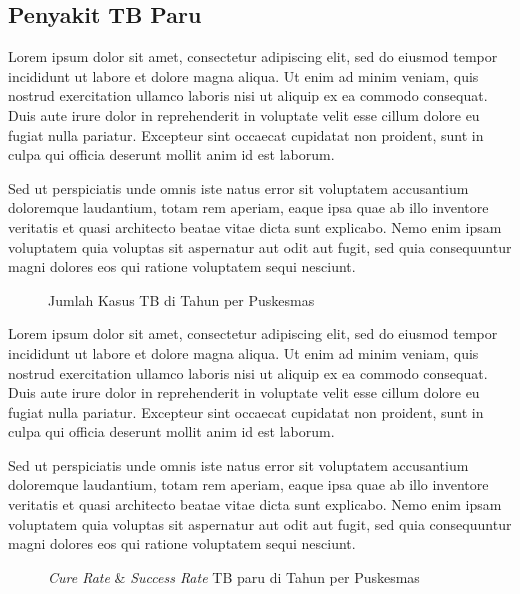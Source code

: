 \subsection{Penyakit TB Paru}

Lorem ipsum dolor sit amet, consectetur adipiscing elit, sed do eiusmod tempor incididunt ut labore et dolore magna aliqua. Ut enim ad minim veniam, quis nostrud exercitation ullamco laboris nisi ut aliquip ex ea commodo consequat. Duis aute irure dolor in reprehenderit in voluptate velit esse cillum dolore eu fugiat nulla pariatur. Excepteur sint occaecat cupidatat non proident, sunt in culpa qui officia deserunt mollit anim id est laborum.

Sed ut perspiciatis unde omnis iste natus error sit voluptatem accusantium doloremque laudantium, totam rem aperiam, eaque ipsa quae ab illo inventore veritatis et quasi architecto beatae vitae dicta sunt explicabo. Nemo enim ipsam voluptatem quia voluptas sit aspernatur aut odit aut fugit, sed quia consequuntur magni dolores eos qui ratione voluptatem sequi nesciunt.

\begin{figure}[H]
	\centering
	\caption{Jumlah Kasus TB di \namaKabupaten Tahun \tP per Puskesmas}
	\label{fig:Jumlah-Kasus-TB}
\end{figure}

Lorem ipsum dolor sit amet, consectetur adipiscing elit, sed do eiusmod tempor incididunt ut labore et dolore magna aliqua. Ut enim ad minim veniam, quis nostrud exercitation ullamco laboris nisi ut aliquip ex ea commodo consequat. Duis aute irure dolor in reprehenderit in voluptate velit esse cillum dolore eu fugiat nulla pariatur. Excepteur sint occaecat cupidatat non proident, sunt in culpa qui officia deserunt mollit anim id est laborum.

Sed ut perspiciatis unde omnis iste natus error sit voluptatem accusantium doloremque laudantium, totam rem aperiam, eaque ipsa quae ab illo inventore veritatis et quasi architecto beatae vitae dicta sunt explicabo. Nemo enim ipsam voluptatem quia voluptas sit aspernatur aut odit aut fugit, sed quia consequuntur magni dolores eos qui ratione voluptatem sequi nesciunt.

\begin{figure}[H]
	\centering
	\caption{\emph{Cure Rate} \& \emph{Success Rate} TB paru di \namaKabupaten Tahun \tP per Puskesmas}
	\label{fig:Cure-Rate-TB}
\end{figure}

